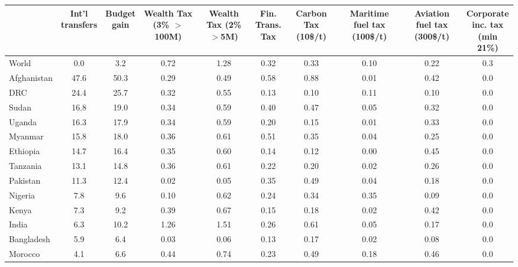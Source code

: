 
\begin{tabular}[t]{lccccccccc}
\toprule
  & \makecell{Int'l\\transfers} & \makecell{Budget\\gain} & \makecell{Wealth\\Tax (3\%\\$>$100M)} & \makecell{Wealth\\Tax (2\%\\$>$5M)} & \makecell{Fin.\\Trans.\\Tax} & \makecell{Carbon\\Tax\\(10\$/t)} & \makecell{Maritime\\fuel tax\\(100\$/t)} & \makecell{Aviation\\fuel tax\\(300\$/t)} & \makecell{Corporate\\inc. tax\\(min 21\%)}\\
\midrule
World & 0.0 & 3.2 & 0.72 & 1.28 & 0.32 & 0.33 & 0.10 & 0.22 & 0.3\\
Afghanistan & 47.6 & 50.3 & 0.29 & 0.49 & 0.58 & 0.88 & 0.01 & 0.42 & 0.0\\
DRC & 24.4 & 25.7 & 0.32 & 0.55 & 0.13 & 0.10 & 0.11 & 0.10 & 0.0\\
Sudan & 16.8 & 19.0 & 0.34 & 0.59 & 0.40 & 0.47 & 0.05 & 0.32 & 0.0\\
Uganda & 16.3 & 17.9 & 0.34 & 0.59 & 0.20 & 0.15 & 0.01 & 0.33 & 0.0\\
Myanmar & 15.8 & 18.0 & 0.36 & 0.61 & 0.51 & 0.35 & 0.04 & 0.25 & 0.0\\
Ethiopia & 14.7 & 16.4 & 0.35 & 0.60 & 0.14 & 0.12 & 0.00 & 0.45 & 0.0\\
Tanzania & 13.1 & 14.8 & 0.36 & 0.61 & 0.22 & 0.20 & 0.02 & 0.26 & 0.0\\
Pakistan & 11.3 & 12.4 & 0.02 & 0.05 & 0.35 & 0.49 & 0.04 & 0.18 & 0.0\\
Nigeria & 7.8 & 9.6 & 0.10 & 0.62 & 0.24 & 0.34 & 0.35 & 0.09 & 0.0\\
Kenya & 7.3 & 9.2 & 0.39 & 0.67 & 0.15 & 0.18 & 0.02 & 0.42 & 0.0\\
India & 6.3 & 10.2 & 1.26 & 1.51 & 0.26 & 0.61 & 0.05 & 0.17 & 0.0\\
Bangladesh & 5.9 & 6.4 & 0.03 & 0.06 & 0.13 & 0.17 & 0.02 & 0.08 & 0.0\\
Morocco & 4.1 & 6.6 & 0.44 & 0.74 & 0.23 & 0.49 & 0.18 & 0.46 & 0.0\\

\end{tabular}

